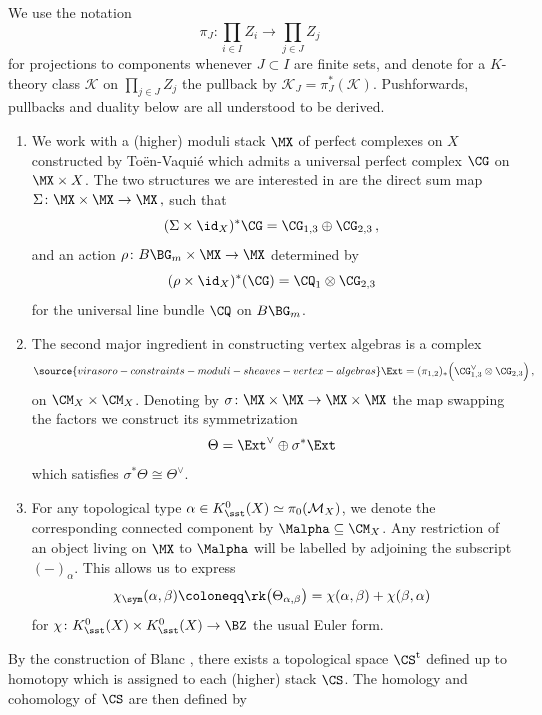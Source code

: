 We use the notation
$$
\pi_{J}\colon\prod_{i\in I}Z_i\longrightarrow \prod_{j\in J}Z_j
$$
for projections to components whenever $J\subset I$ are finite sets,
and denote for a $K$-theory class $\mathcal{K}$ on $\prod_{j\in J}Z_j$ the pullback by $\mathcal{K}_J =\pi^\ast_{J}(\mathcal{K})$. Pushforwards, pullbacks and duality below are all understood to be derived.
\begin{definition}
\notready
\label{def: VOAconstruction}
\begin{enumerate}
\item We work with a (higher) moduli stack $\MX$ of perfect complexes on $X$ constructed by Toën-Vaquié \cite{TV07} which admits a universal perfect complex $\CG$ on $ \MX\times X$.  The two structures we are interested in are the direct sum map
$\Sigma\colon\MX\times \MX\to \MX
\,,$
such that
$$
(\Sigma\times\id_X)^\ast \CG = \CG_{1,3}\oplus \CG_{2,3}\,,
$$
and an action $\rho\colon B\BG_m\times\MX\to \MX$ determined by
$$
(\rho\times \id_X)^\ast(\CG) = \CQ_1\otimes \CG_{2,3}
$$
for the universal line bundle $\CQ$ on $B\BG_m$.
   \item The second major ingredient in constructing vertex algebras is a complex
    \begin{equation}
    \label{Eq: Extcomplex}
\source{virasoro-constraints-moduli-sheaves-vertex-algebras}
    \Ext = (\pi_{1,2})_\ast\Big(\CG_{1,3}^\vee\otimes \CG_{2,3}\Big)\,,    \end{equation}
   on $\CM_X\times \CM_X$. Denoting by  $\sigma\colon \MX\times \MX\to \MX\times \MX$ the map swapping the factors we construct its symmetrization
    $$
    \Theta = \Ext^\vee\oplus \sigma^\ast\Ext
    $$
    which satisfies
    $
   \sigma^* \Theta\cong \Theta^\vee.
    $
    \item For any topological type $\alpha\in K_\sst^0(X)\simeq \pi_0(\mathcal{M}_X)$, we denote the corresponding connected component by $\Malpha\subseteq \CM_X$. Any restriction of an object living on $\MX$ to $\Malpha$ will be labelled by adjoining the subscript $(-)_{\alpha}$. This allows us to express
    $$
   \chi_{\sym}(\alpha,\beta)\coloneqq \rk\big(\Theta_{\alpha,\beta}\big) = \chi(\alpha,\beta) + \chi(\beta,\alpha)
    $$
    for $\chi\colon K_\sst^0(X)\times K_\sst^0(X)\to \BZ$ the usual Euler form.
 \end{enumerate}
\end{definition}
By the construction of Blanc \cite[Section 3.4]{B16}, there exists a topological space $\CS^{\text{t}}$ defined up to homotopy which is assigned to each (higher) stack $\CS$. The homology and cohomology of $\CS$ are then defined by
